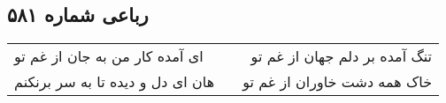 \begin{center}
\section*{رباعی شماره ۵۸۱}
\label{sec:sh581}
\begin{longtable}{l p{0.5cm} r}
ای آمده کار من به جان از غم تو
&&
تنگ آمده بر دلم جهان از غم تو
\\
هان ای دل و دیده تا به سر برنکنم
&&
خاک همه دشت خاوران از غم تو
\\
\end{longtable}
\end{center}
